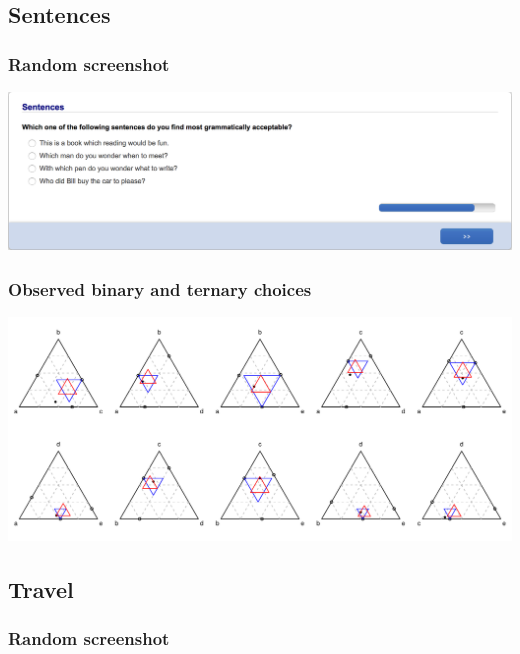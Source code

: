 \documentclass[11pt,letter]{article}
\begin{document}
\pagebreak

\subsection*{Sentences}



\subsubsection*{Random screenshot}

\includegraphics[width=15cm]{Population_study_design/screenshot_sentences.png}

\subsubsection*{Observed binary and ternary choices}

\includegraphics[width=15cm]{./Population_study_data/Simplexes/sentences.pdf}

\pagebreak

\subsection*{Travel}



\subsubsection*{Random screenshot}
\end{document}

